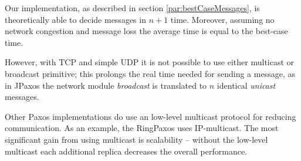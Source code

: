 Our implementation, as described in section \ref{par:bestCaseMessages}, is theoretically able to decide messages in $n+1$ time. Moreover, assuming no network congestion and message loss the average time is equal to the best-case time.

However, with TCP and simple UDP it is not possible to use either multicast or broadcast primitive; this prolongs the real time needed for sending a message, as in JPaxos the network module \emph{broadcast} is translated to $n$ identical \textit{unicast} messages.

Other Paxos implementations do use an low-level multicast protocol for reducing communication. As an example, the RingPaxos \cite{Mar10} uses IP-multicast. The most significant gain from using multicast is scalability -- without the low-level multicast each additional replica decreases the overall performance.

